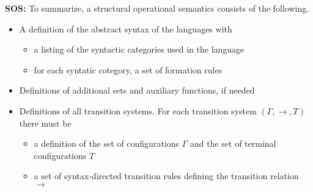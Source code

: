 \documentclass[12pt]{article}
\begin{document}
\textbf{SOS:} To summarize, a structural operational semantics consists of the following.
\begin{itemize}
        \item A definition of the abstract syntax of the languages with
        \begin{itemize}
                \item a listing of the syntactic categories used in the language
                \item for each syntatic cotegory, a set of formation rules
        \end{itemize}
        \item Definitions of additional sets and auxiliary functions, if needed
        \item Definitions of all transition systems. For each transition system $(\Gamma, \rightarrow,T)$ there must be
        \begin{itemize}
                \item a definition of the set of configurations $\Gamma$ and the set of terminal configurations $T$
                \item a set of syntax-directed transition rules defining the transition relation $\rightarrow$
        \end{itemize}
\end{itemize}
\end{document}
